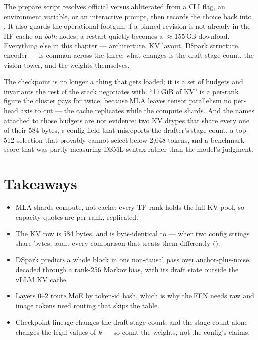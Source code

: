 The prepare script resolves official versus abliterated from a CLI flag, an
environment variable, or an interactive prompt, then records the choice back
into . It also guards the operational footgun: if a
pinned revision is not already in the HF cache on \emph{both} nodes, a
restart quietly becomes a $\approx$155\,GB download. Everything else in this chapter ---
architecture, KV layout, DSpark structure, encoder --- is common across the
three; what changes is the draft stage count, the vision tower, and the
weights themselves.

\FloatBarrier
The checkpoint is no longer a thing that gets loaded; it is a set of budgets
and invariants the rest of the stack negotiates with. ``17\,GiB of KV'' is a
per-rank figure the cluster pays for twice, because MLA leaves tensor
parallelism no per-head axis to cut --- the cache replicates while the
compute shards. And the names attached to those budgets are not evidence:
two KV dtypes that share every one of their 584 bytes, a config field that
misreports the drafter's stage count, a top-512 selection that provably
cannot select below 2{,}048 tokens, and a benchmark score that was partly
measuring DSML syntax rather than the model's judgment.

\section*{Takeaways}

\begin{itemize}
  \item MLA shards compute, not cache: every TP rank holds the full KV pool,
  so capacity quotes are per rank, replicated.
  \item The KV row is 584 bytes, and  is byte-identical
  to  --- when two config strings share bytes, audit every
  comparison that treats them differently ().
  \item DSpark predicts a whole block in one non-causal pass over
  anchor-plus-noise, decoded through a rank-256 Markov bias, with its draft
  state outside the vLLM KV cache.
  \item Layers 0--2 route MoE by token-id hash, which is why the FFN needs
  raw  and image tokens need  routing that
  skips the table.
  \item Checkpoint lineage changes the draft-stage count, and the stage
  count alone changes the legal values of $k$ --- so count the weights, not
  the config's claims.
\end{itemize}

